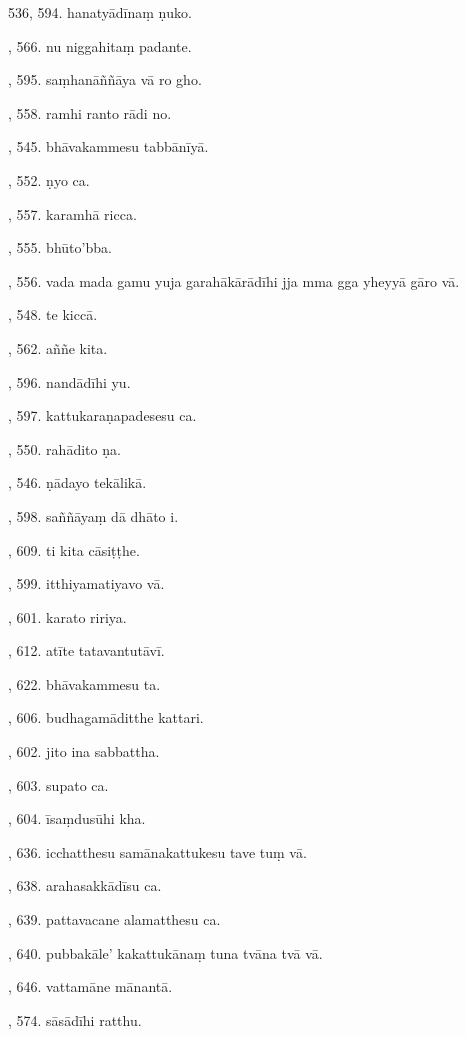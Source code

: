 536, 594. hanatyādīnaṃ ṇuko.\par {}, 566. nu niggahitaṃ padante.\par {}, 595. saṃhanāññāya vā ro gho.\par {}, 558. ramhi ranto rādi no.\par {}, 545. bhāvakammesu tabbānīyā.\par {}, 552. ṇyo ca.\par {}, 557. karamhā ricca.\par {}, 555. bhūto’bba.\par {}, 556. vada mada gamu yuja garahākārādīhi jja mma gga yheyyā gāro vā.\par {}, 548. te kiccā.\par {}, 562. aññe kita.\par {}, 596. nandādīhi yu.\par {}, 597. kattukaraṇapadesesu ca.\par {}, 550. rahādito ṇa.\par {}, 546. ṇādayo tekālikā.\par {}, 598. saññāyaṃ dā dhāto i.\par {}, 609. ti kita cāsiṭṭhe.\par {}, 599. itthiyamatiyavo vā.\par {}, 601. karato ririya.\par {}, 612. atīte tatavantutāvī.\par {}, 622. bhāvakammesu ta.\par {}, 606. budhagamāditthe kattari.\par {}, 602. jito ina sabbattha.\par {}, 603. supato ca.\par {}, 604. īsaṃdusūhi kha.\par {}, 636. icchatthesu samānakattukesu tave tuṃ vā.\par {}, 638. arahasakkādīsu ca.\par {}, 639. pattavacane alamatthesu ca.\par {}, 640. pubbakāle’ kakattukānaṃ tuna tvāna tvā vā.\par {}, 646. vattamāne mānantā.\par {}, 574. sāsādīhi ratthu.\par \noindent
